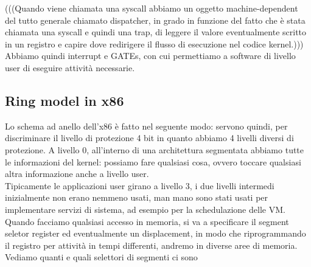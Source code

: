 \documentclass[12pt, oneside]{extbook}
\begin{document}
(((Quando viene chiamata una syscall abbiamo un oggetto machine-dependent del tutto generale chiamato dispatcher, in grado in funzione del fatto che è stata chiamata una syscall e quindi una trap, di leggere il valore eventualmente scritto in un registro e capire dove redirigere il flusso di esecuzione nel codice kernel.)))\\Abbiamo quindi interrupt e GATEs, con cui permettiamo a software di livello user di eseguire attività necessarie.
\subsection{Ring model in x86}
Lo schema ad anello dell'x86 è fatto nel seguente modo:
servono quindi, per discriminare il livello di protezione 4 bit in quanto abbiamo 4 livelli diversi di protezione. A livello 0, all'interno di una architettura segmentata abbiamo tutte le informazioni del kernel: possiamo fare qualsiasi cosa, ovvero toccare qualsiasi altra informazione anche a livello user.\\ Tipicamente le applicazioni user girano a livello 3, i due livelli intermedi inizialmente non erano nemmeno usati, man mano sono stati usati per implementare servizi di sistema, ad esempio per la schedulazione delle VM.\\ Quando facciamo qualsiasi accesso in memoria, si va a specificare il segment seletor register ed eventualmente un displacement, in modo che riprogrammando il registro per attività in tempi differenti, andremo in diverse aree di memoria. Vediamo quanti e quali selettori di segmenti ci sono
\end{document}
